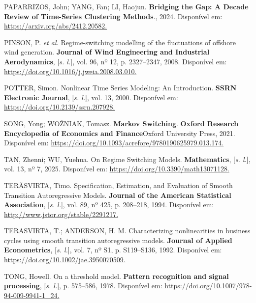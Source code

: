 \documentclass[
  letterpaper,
  DIV=11,
  numbers=noendperiod]{scrartcl}
\newlength{\cslhangindent}
\newenvironment{CSLReferences}[2] %
 {\begin{list}{}{%
  \setlength{\itemindent}{0pt}
  \setlength{\leftmargin}{0pt}
  \setlength{\parsep}{0pt}
  \ifodd #1
   \setlength{\leftmargin}{\cslhangindent}
   \setlength{\itemindent}{-1\cslhangindent}
  \fi
  \setlength{\itemsep}{#2\baselineskip}}}
 {\end{list}}
\numberwithin{equation}{section}
\numberwithin{table}{section}
\numberwithin{figure}{section}
\begin{document}
\begin{CSLReferences}{0}{1}
PAPARRIZOS, John; YANG, Fan; LI, Haojun. \textbf{Bridging the Gap: A
Decade Review of Time-Series Clustering Methods}., 2024. Disponível em:
\href{https://arxiv.org/abs/2412.20582}{https://arxiv.org/abs/2412.20582.
}

PINSON, P. \emph{et al.} Regime-switching modelling of the fluctuations
of offshore wind generation. \textbf{Journal of Wind Engineering and
Industrial Aerodynamics}, {[}\emph{s. l.}{]}, vol. 96, nº 12, p.
2327--2347, 2008. Disponível em:
\href{https://doi.org/10.1016/j.jweia.2008.03.010}{https://doi.org/10.1016/j.jweia.2008.03.010.
}

POTTER, Simon. Nonlinear Time Series Modeling: An Introduction.
\textbf{SSRN Electronic Journal}, {[}\emph{s. l.}{]}, vol. 13, 2000.
Disponível em:
\href{https://doi.org/10.2139/ssrn.207928}{https://doi.org/10.2139/ssrn.207928.
}

SONG, Yong; WOŹNIAK, Tomasz. \textbf{Markov Switching}. \textbf{Oxford
Research Encyclopedia of Economics and Finance}Oxford University Press,
2021. Disponível em:
\href{https://doi.org/10.1093/acrefore/9780190625979.013.174}{https://doi.org/10.1093/acrefore/9780190625979.013.174.
}

TAN, Zhenni; WU, Yuehua. On Regime Switching Models.
\textbf{Mathematics}, {[}\emph{s. l.}{]}, vol. 13, nº 7, 2025.
Disponível em:
\href{https://doi.org/10.3390/math13071128}{https://doi.org/10.3390/math13071128.
}

TERÄSVIRTA, Timo. Specification, Estimation, and Evaluation of Smooth
Transition Autoregressive Models. \textbf{Journal of the American
Statistical Association}, {[}\emph{s. l.}{]}, vol. 89, nº 425, p.
208--218, 1994. Disponível em:
\href{http://www.jstor.org/stable/2291217}{http://www.jstor.org/stable/2291217.
}

TERASVIRTA, T.; ANDERSON, H. M. Characterizing nonlinearities in
business cycles using smooth transition autoregressive models.
\textbf{Journal of Applied Econometrics}, {[}\emph{s. l.}{]}, vol. 7, nº
S1, p. S119--S136, 1992. Disponível em:
\href{https://doi.org/10.1002/jae.3950070509}{https://doi.org/10.1002/jae.3950070509.
}

TONG, Howell. On a threshold model. \textbf{Pattern recognition and
signal processing}, {[}\emph{s. l.}{]}, p. 575--586, 1978. Disponível
em:
\href{https://doi.org/10.1007/978-94-009-9941-1_24}{https://doi.org/10.1007/978-94-009-9941-1\_24.
}


\end{CSLReferences}
\end{document}
